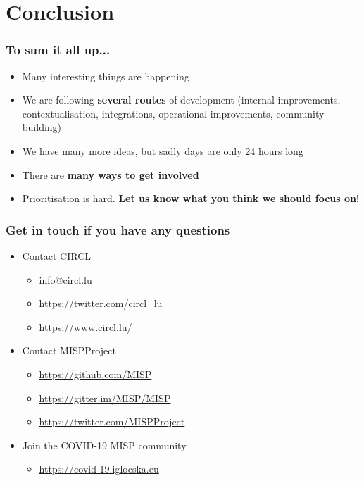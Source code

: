 \section{Conclusion}

\begin{frame}
  \frametitle{To sum it all up...}
  \begin{itemize}
     \item Many interesting things are happening
     \item We are following {\bf several routes} of development (internal improvements, contextualisation, integrations, operational improvements, community building)
     \item We have many more ideas, but sadly days are only 24 hours long
     \item There are {\bf many ways to get involved}
     \item Prioritisation is hard. {\bf Let us know what you think we should focus on}!
  \end{itemize}
\end{frame}

\begin{frame}
  \frametitle{Get in touch if you have any questions}
  \begin{itemize}
    \item Contact CIRCL
    \begin{itemize}
      \item info@circl.lu
      \item \url{https://twitter.com/circl_lu}
      \item \url{https://www.circl.lu/}
    \end{itemize}
    \item Contact MISPProject 
    \begin{itemize}
      \item \url{https://github.com/MISP}
      \item \url{https://gitter.im/MISP/MISP}
      \item \url{https://twitter.com/MISPProject}
    \end{itemize}
    \item Join the COVID-19 MISP community
    \begin{itemize}
      \item \url{https://covid-19.iglocska.eu}
    \end{itemize}
  \end{itemize}
\end{frame}
